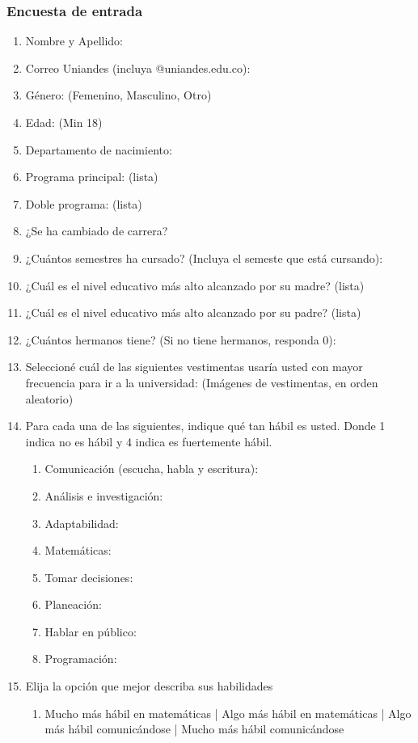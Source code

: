 \subsubsection{Encuesta de entrada}
\begin{enumerate}
\item Nombre y Apellido:
\item Correo Uniandes (incluya @uniandes.edu.co):
\item Género: (Femenino, Masculino, Otro)
\item Edad: (Min 18)
\item Departamento de nacimiento:
\item Programa principal: (lista)
\item Doble programa: (lista)
\item ¿Se ha cambiado de carrera?
\item ¿Cuántos semestres ha cursado? (Incluya el semeste que está cursando):
\item ¿Cuál es el nivel educativo más alto alcanzado por su madre? (lista)
\item ¿Cuál es el nivel educativo más alto alcanzado por su padre? (lista)
\item ¿Cuántos hermanos tiene? (Si no tiene hermanos, responda 0):
\item Seleccioné cuál de las siguientes vestimentas usaría usted con mayor frecuencia para ir a la universidad: (Imágenes de vestimentas, en orden aleatorio)
\item Para cada una de las siguientes, indique qué tan hábil es usted. Donde 1 indica no es hábil y 4 indica es fuertemente hábil.
\begin{enumerate}
    \item Comunicación (escucha, habla y escritura):
    \item Análisis e investigación:
    \item Adaptabilidad:
    \item Matemáticas:
    \item Tomar decisiones:
    \item Planeación:
    \item Hablar en público:
    \item Programación:
\end{enumerate}
\item Elija la opción que mejor describa sus habilidades
\begin{enumerate}
    \item Mucho más hábil en matemáticas | Algo más hábil en matemáticas | Algo más hábil comunicándose |  Mucho más hábil comunicándose

\end{enumerate}
\end{enumerate}
